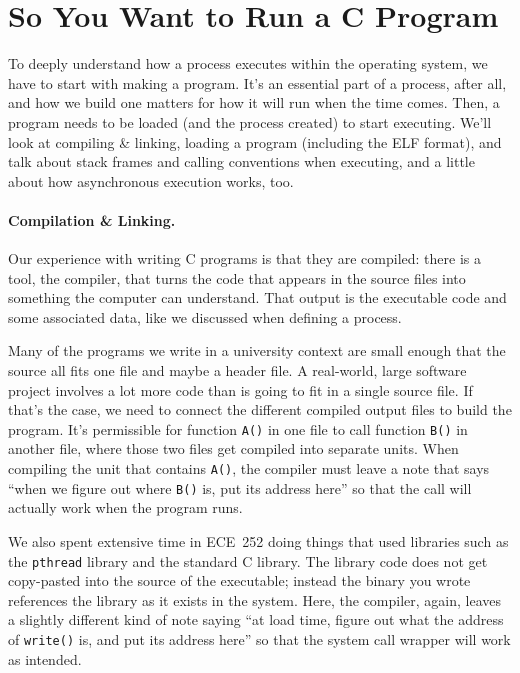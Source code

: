 




\section*{So You Want to Run a C Program}

To deeply understand how a process executes within the operating system, we have to start with making a program. It's an essential part of a process, after all, and how we build one matters for how it will run when the time comes. Then, a program needs to be loaded (and the process created) to start executing. We'll look at compiling \& linking, loading a program (including the ELF format), and talk about stack frames and calling conventions when executing, and a little about how asynchronous execution works, too.

\paragraph{Compilation \& Linking.}  Our experience with writing C programs is that they are compiled: there is a tool, the compiler, that turns the code that appears in the source files into something the computer can understand. That output is the executable code and some associated data, like we discussed when defining a process. 

Many of the programs we write in a university context are small enough that the source all fits one file and maybe a header file. A real-world, large software project involves a lot more code than is going to fit in a single source file. If that's the case, we need to connect the different compiled output files to build the program. It's permissible for function \texttt{A()} in one file to call function \texttt{B()} in another file, where those two files get compiled into separate units. When compiling the unit that contains \texttt{A()}, the compiler must leave a note that says ``when we figure out where \texttt{B()} is, put its address here'' so that the call will actually work when the program runs.

We also spent extensive time in ECE~252 doing things that used libraries such as the \texttt{pthread} library and the standard C library. The library code does not get copy-pasted into the source of the executable; instead the binary you wrote references the library as it exists in the system. Here, the compiler, again, leaves a slightly different kind of note saying ``at load time, figure out what the address of \texttt{write()} is, and put its address here'' so that the system call wrapper will work as intended. 

